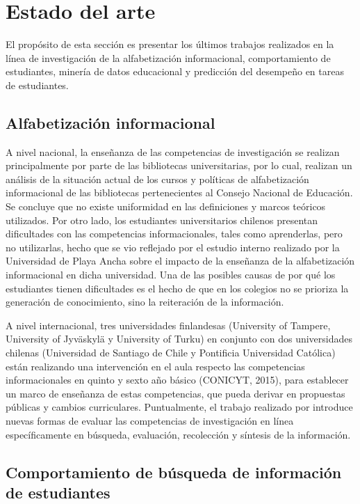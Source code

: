 \section{Estado del arte}
\label{sec:estado_arte}
El propósito de esta sección es presentar los últimos trabajos realizados en la línea de investigación de la alfabetización informacional, comportamiento de estudiantes, minería de datos educacional y predicción del desempeño en tareas de estudiantes.

\subsection{Alfabetización informacional}
A nivel nacional, la enseñanza de las competencias de investigación se realizan principalmente por parte de las bibliotecas universitarias, por lo cual, \textcite{marzal2015diagnostico} realizan un análisis de la situación actual de los cursos y políticas de alfabetización informacional de las bibliotecas pertenecientes al Consejo Nacional de Educación. Se concluye que no existe uniformidad en las definiciones y marcos teóricos utilizados. Por otro lado, los estudiantes universitarios chilenos presentan dificultades con las competencias informacionales, tales como aprenderlas, pero no utilizarlas, hecho que se vio reflejado por el estudio interno realizado por la Universidad de Playa Ancha \parencite{urra2016alfabetizacion} sobre el impacto de la enseñanza de la alfabetización informacional en dicha universidad. Una de las posibles causas de por qué los estudiantes tienen dificultades es el hecho de que en los colegios no se prioriza la generación de conocimiento, sino la reiteración de la información.

A nivel internacional, tres universidades finlandesas (University of Tampere, University of Jyv\"askyl\"a y University of Turku) en conjunto con dos universidades chilenas (Universidad de Santiago de Chile y Pontificia Universidad Católica) están realizando una intervención en el aula respecto las competencias informacionales en quinto y sexto año básico (CONICYT, 2015), para establecer un marco de enseñanza de estas competencias, que pueda derivar en propuestas públicas y cambios curriculares. Puntualmente, el trabajo realizado por \textcite{gonzalez2017neurone} introduce nuevas formas de evaluar las competencias de investigación en línea específicamente en búsqueda, evaluación, recolección y síntesis de la información.

\subsection{Comportamiento de búsqueda de información de estudiantes}

